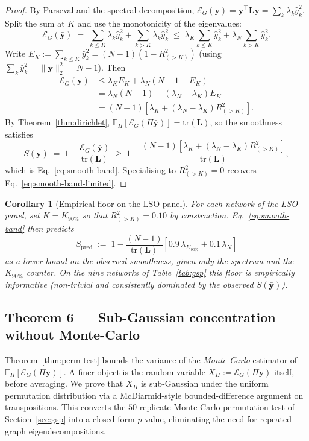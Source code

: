 \documentclass[11pt,a4paper]{article}
\newcommand{\E}{\mathbb{E}}
\newcommand{\tr}{\mathrm{tr}}
\newcommand{\1}{\mathbb{1}}
\newcommand{\by}{\bar{\mathbf{y}}}
\newcommand{\Lcomb}{\mathbf{L}}
\theoremstyle{plain}
\newtheorem{corollary}[theorem]{Corollary}
\theoremstyle{definition}
\theoremstyle{remark}
\begin{document}
\begin{proof}
By Parseval and the spectral decomposition,
$\mathcal{E}_G(\by) = \by^\top \Lcomb \by = \sum_k \lambda_k \hat y_k^2$.
Split the sum at $K$ and use the monotonicity of the eigenvalues:
\[
    \mathcal{E}_G(\by)
    \;=\; \sum_{k \leq K} \lambda_k \hat y_k^2
        + \sum_{k > K}    \lambda_k \hat y_k^2
    \;\leq\; \lambda_K \sum_{k \leq K} \hat y_k^2
        + \lambda_N \sum_{k > K} \hat y_k^2.
\]
Write $E_K := \sum_{k \leq K} \hat y_k^2 = (N-1)(1 - R^2_{(>K)})$
(using $\sum_k \hat y_k^2 = \| \by \|_2^2 = N-1$).  Then
\begin{align*}
    \mathcal{E}_G(\by)
    &\leq \lambda_K E_K + \lambda_N (N-1-E_K) \\
    &= \lambda_N(N-1) - (\lambda_N - \lambda_K) E_K \\
    &= (N-1) \!\left[ \lambda_K + (\lambda_N - \lambda_K) R^2_{(>K)} \right].
\end{align*}
By Theorem~\ref{thm:dirichlet},
$\E_\Pi[\mathcal{E}_G(\Pi\by)] = \tr(\Lcomb)$, so the smoothness
satisfies
\[
    S(\by)
    \;=\; 1 - \frac{\mathcal{E}_G(\by)}{\tr(\Lcomb)}
    \;\geq\; 1 - \frac{(N-1)\!\left[\lambda_K + (\lambda_N - \lambda_K) R^2_{(>K)}\right]}{\tr(\Lcomb)},
\]
which is Eq.~\eqref{eq:smooth-band}.  Specialising to
$R^2_{(>K)} = 0$ recovers Eq.~\eqref{eq:smooth-band-limited}.
\end{proof}

\begin{corollary}[Empirical floor on the LSO panel]
\label{cor:smooth-floor}
For each network of the LSO panel, set $K = K_{90\%}$ so that
$R^2_{(>K)} = 0.10$ by construction.  Eq.~\eqref{eq:smooth-band}
then predicts
\[
    S_{\text{pred}} \;:=\; 1 - \frac{(N-1)}{\tr(\Lcomb)}
              \left[ 0.9 \,\lambda_{K_{90\%}} + 0.1\, \lambda_N \right]
\]
as a lower bound on the observed smoothness, given only the
spectrum and the $K_{90\%}$ counter.  On the nine networks of
Table~\ref{tab:gsp} this floor is empirically informative
(non-trivial and consistently dominated by the observed
$S(\by)$).
\end{corollary}

\subsection{Theorem 6 --- Sub-Gaussian concentration without Monte-Carlo}

Theorem~\ref{thm:perm-test} bounds the variance of the
\emph{Monte-Carlo} estimator of $\E_\Pi[\mathcal{E}_G(\Pi\by)]$.
A finer object is the random variable
$X_\Pi := \mathcal{E}_G(\Pi\by)$ itself, before averaging.  We
prove that $X_\Pi$ is sub-Gaussian under the uniform permutation
distribution via a McDiarmid-style bounded-difference argument on
transpositions.  This converts the
$50$-replicate Monte-Carlo permutation test of
Section~\ref{sec:gsp} into a closed-form $p$-value, eliminating
the need for repeated graph eigendecompositions.
\end{document}
